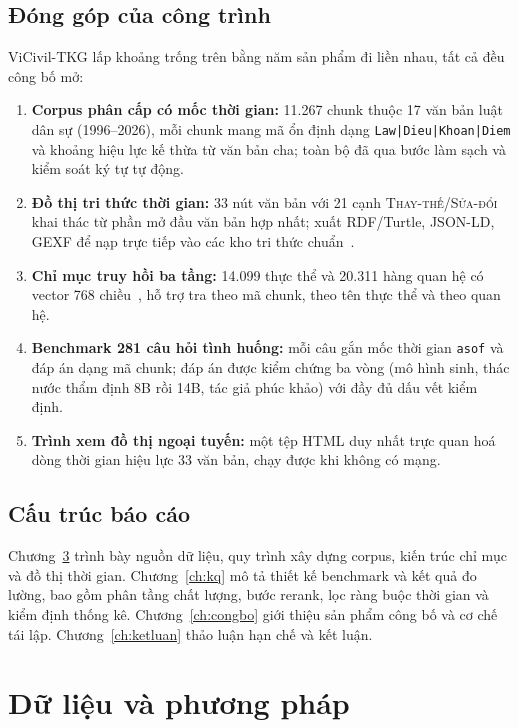 \documentclass[12pt,a4paper]{report}
\renewcommand{\_}{\textunderscore\allowbreak}
\begin{document}
\section{Đóng góp của công trình}

ViCivil-TKG lấp khoảng trống trên bằng năm sản phẩm đi liền nhau, tất cả đều công bố mở:

\begin{enumerate}
  \item \textbf{Corpus phân cấp có mốc thời gian:} 11.267 chunk thuộc 17 văn bản luật dân sự (1996--2026), mỗi chunk mang mã ổn định dạng \texttt{Law|Dieu|Khoan|Diem} và khoảng hiệu lực kế thừa từ văn bản cha; toàn bộ đã qua bước làm sạch và kiểm soát ký tự tự động.
  \item \textbf{Đồ thị tri thức thời gian:} 33 nút văn bản với 21 cạnh \textsc{Thay-thế}/\textsc{Sửa-đổi} khai thác từ phần mở đầu văn bản hợp nhất; xuất RDF/Turtle, JSON-LD, GEXF để nạp trực tiếp vào các kho tri thức chuẩn~\cite{rdf11,jsonld}.
  \item \textbf{Chỉ mục truy hồi ba tầng:} 14.099 thực thể và 20.311 hàng quan hệ có vector 768 chiều~\cite{embeddinggemma}, hỗ trợ tra theo mã chunk, theo tên thực thể và theo quan hệ.
  \item \textbf{Benchmark 281 câu hỏi tình huống:} mỗi câu gắn mốc thời gian \texttt{as\_of} và đáp án dạng mã chunk; đáp án được kiểm chứng ba vòng (mô hình sinh, thác nước thẩm định 8B rồi 14B, tác giả phúc khảo) với đầy đủ dấu vết kiểm định.
  \item \textbf{Trình xem đồ thị ngoại tuyến:} một tệp HTML duy nhất trực quan hoá dòng thời gian hiệu lực 33 văn bản, chạy được khi không có mạng.
\end{enumerate}

\section{Cấu trúc báo cáo}

Chương~\ref{ch:data} trình bày nguồn dữ liệu, quy trình xây dựng corpus, kiến trúc chỉ mục và đồ thị thời gian. Chương~\ref{ch:kq} mô tả thiết kế benchmark và kết quả đo lường, bao gồm phân tầng chất lượng, bước rerank, lọc ràng buộc thời gian và kiểm định thống kê. Chương~\ref{ch:congbo} giới thiệu sản phẩm công bố và cơ chế tái lập. Chương~\ref{ch:ketluan} thảo luận hạn chế và kết luận.

\chapter{Dữ liệu và phương pháp}\label{ch:data}
\end{document}

